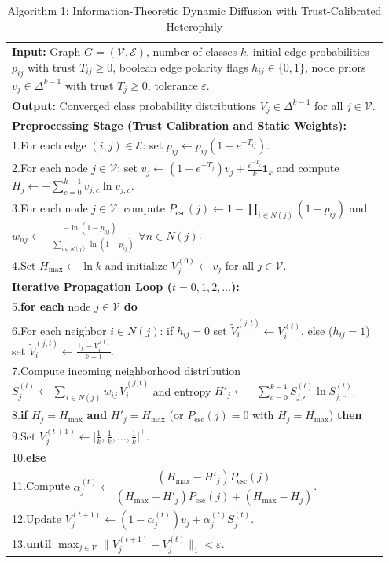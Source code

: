 \documentclass[11pt, a4paper]{article}
\theoremstyle{definition}
\theoremstyle{definition}
\begin{document}
\begin{table}[!htbp]
\centering
\caption{Algorithm 1: Information-Theoretic Dynamic Diffusion with Trust-Calibrated Heterophily}
\label{tab:algo_en}
{\small
\begin{tabular}{p{0.95\linewidth}}
\toprule
\textbf{Input:} Graph $G=(\mathcal{V},\mathcal{E})$, number of classes $k$, initial edge probabilities $p_{ij}$ with trust $T_{ij} \ge 0$, boolean edge polarity flags $h_{ij} \in \{0,1\}$, node priors $v_j \in \Delta^{k-1}$ with trust $T_j \ge 0$, tolerance $\varepsilon$.\\
\textbf{Output:} Converged class probability distributions $V_j \in \Delta^{k-1}$ for all $j \in \mathcal{V}$.\\
\midrule
\textbf{Preprocessing Stage (Trust Calibration and Static Weights):}\\
1.\quad For each edge $(i,j) \in \mathcal{E}$: set $p_{ij} \leftarrow p_{ij}\left(1 - e^{-T_{ij}}\right)$.\\
2.\quad For each node $j \in \mathcal{V}$: set $v_j \leftarrow \left(1 - e^{-T_j}\right)v_j + \frac{e^{-T_j}}{k}\mathbf{1}_k$ and compute $H_j \leftarrow -\sum_{c=0}^{k-1} v_{j,c}\ln v_{j,c}$.\\
3.\quad For each node $j \in \mathcal{V}$: compute $P_{\mathrm{esc}}(j) \leftarrow 1 - \prod_{i \in N(j)}(1 - p_{ij})$ and $w_{nj} \leftarrow \frac{-\ln(1-p_{nj})}{-\sum_{i \in N(j)}\ln(1-p_{ij})}$ $\forall n \in N(j)$.\\
4.\quad Set $H_{\max} \leftarrow \ln k$ and initialize $V_j^{(0)} \leftarrow v_j$ for all $j \in \mathcal{V}$.\\[4pt]
\textbf{Iterative Propagation Loop ($t = 0, 1, 2, \dots$):}\\
5.\quad \textbf{for each} node $j \in \mathcal{V}$ \textbf{do}\\
6.\quad\quad For each neighbor $i \in N(j)$: if $h_{ij} = 0$ set $\tilde{V}_i^{(j,t)} \leftarrow V_i^{(t)}$, else ($h_{ij}=1$) set $\tilde{V}_i^{(j,t)} \leftarrow \frac{\mathbf{1}_k - V_i^{(t)}}{k - 1}$.\\
7.\quad\quad Compute incoming neighborhood distribution $S_j^{(t)} \leftarrow \sum_{i \in N(j)} w_{ij}\,\tilde{V}_i^{(j,t)}$ and entropy $H'_j \leftarrow -\sum_{c=0}^{k-1} S_{j,c}^{(t)}\ln S_{j,c}^{(t)}$.\\
8.\quad\quad \textbf{if} $H_j = H_{\max}$ \textbf{and} $H'_j = H_{\max}$ (or $P_{\mathrm{esc}}(j)=0$ with $H_j = H_{\max}$) \textbf{then}\\
9.\quad\quad\quad Set $V_j^{(t+1)} \leftarrow \big[\frac{1}{k}, \frac{1}{k}, \dots, \frac{1}{k}\big]^\top$.\\
10.\quad\quad \textbf{else}\\
11.\quad\quad\quad Compute $\alpha_j^{(t)} \leftarrow \dfrac{(H_{\max} - H'_j)P_{\mathrm{esc}}(j)}{(H_{\max} - H'_j)P_{\mathrm{esc}}(j) + (H_{\max} - H_j)}$.\\
12.\quad\quad\quad Update $V_j^{(t+1)} \leftarrow \left(1 - \alpha_j^{(t)}\right)v_j + \alpha_j^{(t)} S_j^{(t)}$.\\
13.\quad \textbf{until} $\max_{j \in \mathcal{V}} \|V_j^{(t+1)} - V_j^{(t)}\|_1 < \varepsilon$.\\
\bottomrule
\end{tabular}}
\end{table}
\end{document}
